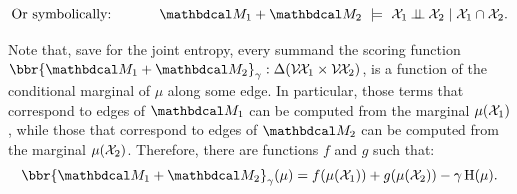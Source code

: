 
\[ 
    \text{Or symbolically: }\qquad\quad
    \dg M_1 \bundle \dg M_2
        ~\models~
    \X_1 \mathbin{\bot\!\!\!\bot} \X_2 \mid \X_1 \cap \X_2. \] 
\begin{lproof}\label{proof:markov-property}
    Note that,
    save for the joint entropy, every summand the scoring function $\bbr{\dg M_1 + \dg M_2}_\gamma : \Delta(\V\!\X_1 \times \V\!\X_2)$, is a function of the conditional marginal of $\mu$ along some edge.
    In particular, those terms that correspond to edges of $\dg M_1$ can be computed from the marginal $\mu(\mathcal X_1)$, while those that correspond to edges of $\dg M_2$ can be computed from the marginal $\mu(\mathcal X_2)$.
    Therefore, there are functions $f$ and $g$ such that:
    \[
        \bbr{\dg M_1 \bundle \dg M_2}_\gamma(\mu) = f(\mu(\X_1)) + g(\mu(\X_2)) - \gamma \H(\mu).
    \]
    

\end{lproof}
